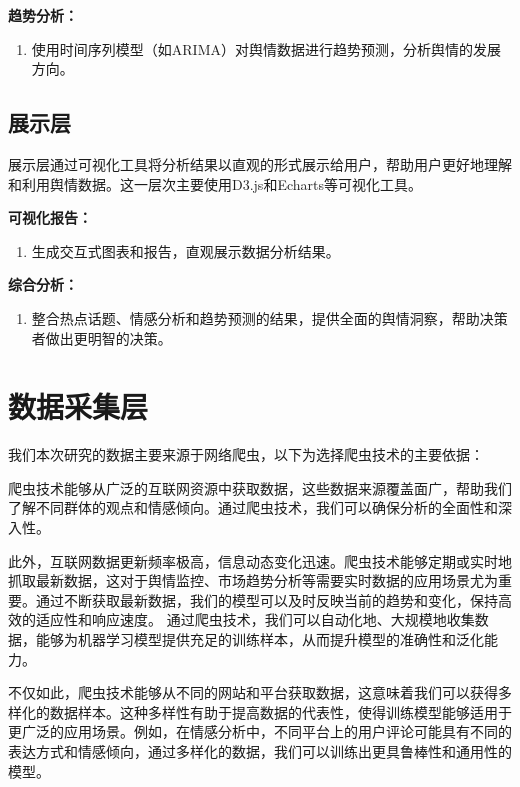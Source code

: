 \documentclass[UTF8,a4paper,15pt,titlepage,oneside]{ctexbook}
\begin{document}
\vskip 0.2cm
\noindent
\textbf{趋势分析：}

\begin{enumerate}[\textbullet]
  \item 使用时间序列模型（如ARIMA）对舆情数据进行趋势预测，分析舆情的发展方向。

\end{enumerate}

\subsection{展示层}

展示层通过可视化工具将分析结果以直观的形式展示给用户，帮助用户更好地理解和利用舆情数据。这一层次主要使用D3.js和Echarts等可视化工具。

\vskip 0.2cm
\noindent
\textbf{可视化报告：}

\begin{enumerate}[\textbullet]
  \item 生成交互式图表和报告，直观展示数据分析结果。
\end{enumerate}

\vskip 0.2cm
\noindent
\textbf{综合分析：}

\begin{enumerate}[\textbullet]
  \item 整合热点话题、情感分析和趋势预测的结果，提供全面的舆情洞察，帮助决策者做出更明智的决策。
\end{enumerate}


\section{数据采集层}

我们本次研究的数据主要来源于网络爬虫，以下为选择爬虫技术的主要依据：

爬虫技术能够从广泛的互联网资源中获取数据，这些数据来源覆盖面广，帮助我们了解不同群体的观点和情感倾向。通过爬虫技术，我们可以确保分析的全面性和深入性。


此外，互联网数据更新频率极高，信息动态变化迅速。爬虫技术能够定期或实时地抓取最新数据，这对于舆情监控、市场趋势分析等需要实时数据的应用场景尤为重要。通过不断获取最新数据，我们的模型可以及时反映当前的趋势和变化，保持高效的适应性和响应速度。
通过爬虫技术，我们可以自动化地、大规模地收集数据，能够为机器学习模型提供充足的训练样本，从而提升模型的准确性和泛化能力。

不仅如此，爬虫技术能够从不同的网站和平台获取数据，这意味着我们可以获得多样化的数据样本。这种多样性有助于提高数据的代表性，使得训练模型能够适用于更广泛的应用场景。例如，在情感分析中，不同平台上的用户评论可能具有不同的表达方式和情感倾向，通过多样化的数据，我们可以训练出更具鲁棒性和通用性的模型。
\end{document}
